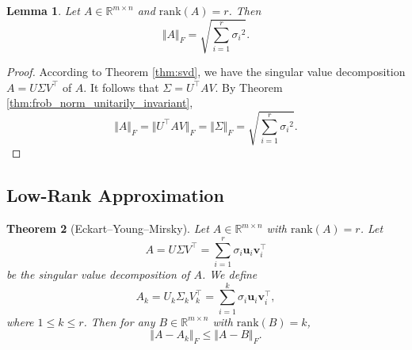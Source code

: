 \documentclass[12pt]{article}
\newtheorem{theorem}{Theorem}[subsection]
\newtheorem{lemma}[theorem]{Lemma}
\theoremstyle{definition}
\begin{document}
\begin{lemma} \label{lem:frob_norm_def_3}
    Let $A \in \mathbb{R}^{m\times n}$ and $\mathrm{rank}(A)=r$. Then
    \[ \Vert A \Vert_F = \sqrt{\sum_{i=1}^r {\sigma_i}^2}. \]
\end{lemma}

\begin{proof}
    According to Theorem \ref{thm:svd}, we have the singular value decomposition $A=U\Sigma V^\top$ of $A$. It follows that $\Sigma=U^\top AV$. By Theorem \ref{thm:frob_norm_unitarily_invariant}, 
    \[ \Vert A\Vert_F 
    = \Vert U^\top A V \Vert_F 
    = \Vert \Sigma \Vert_F 
    = \sqrt{\sum_{i=1}^r {\sigma_i}^2}.
    \]
\end{proof}

\subsection{Low-Rank Approximation}
\begin{theorem}[Eckart–Young–Mirsky] \label{thm:eym}
    Let $A \in\mathbb{R}^{m\times n}$ with $\mathrm{rank}(A)=r$. Let
    \[ A = U\Sigma V^\top = \sum_{i=1}^r \sigma_i \mathbf{u}_i \mathbf{v}_i^\top \]
    be the singular value decomposition of $A$. We define
    \[ A_k = U_k\Sigma_k V^\top_k = \sum_{i=1}^k \sigma_i \mathbf{u}_i \mathbf{v}_i^\top, \]
    where $1\leq k\leq r$. Then for any $B \in\mathbb{R}^{m\times n}$ with $\mathrm{rank}(B) = k$, 
    \[ \Vert A - A_k \Vert_F \leq \Vert A-B\Vert_F. \]
\end{theorem}
\end{document}
